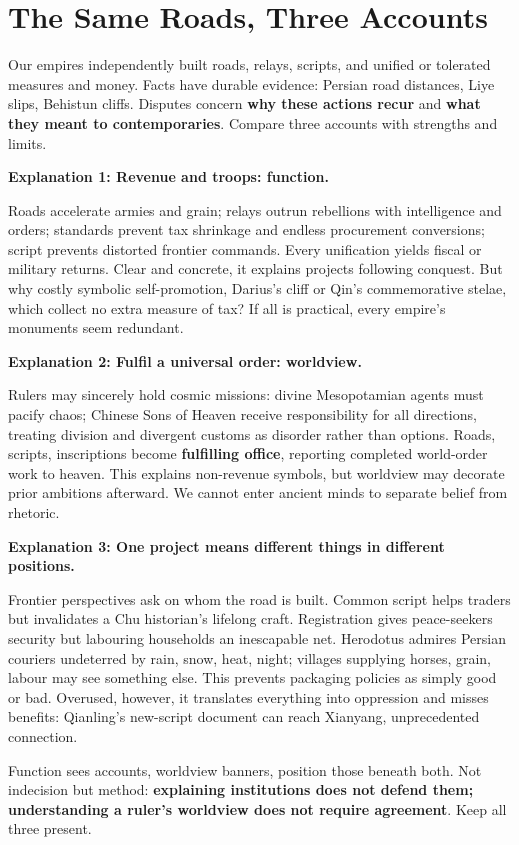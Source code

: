 \section{The Same Roads, Three Accounts}
Our empires independently built roads, relays, scripts, and unified or tolerated measures and money. Facts have durable evidence: Persian road distances, Liye slips, Behistun cliffs. Disputes concern \textbf{why these actions recur} and \textbf{what they meant to contemporaries}. Compare three accounts with strengths and limits.

\textbf{Explanation 1: Revenue and troops: function.}

Roads accelerate armies and grain; relays outrun rebellions with intelligence and orders; standards prevent tax shrinkage and endless procurement conversions; script prevents distorted frontier commands. Every unification yields fiscal or military returns. Clear and concrete, it explains projects following conquest. But why costly symbolic self-promotion, Darius's cliff or Qin's commemorative stelae, which collect no extra measure of tax? If all is practical, every empire's monuments seem redundant.

\textbf{Explanation 2: Fulfil a universal order: worldview.}

Rulers may sincerely hold cosmic missions: divine Mesopotamian agents must pacify chaos; Chinese Sons of Heaven receive responsibility for all directions, treating division and divergent customs as disorder rather than options. Roads, scripts, inscriptions become \textbf{fulfilling office}, reporting completed world-order work to heaven. This explains non-revenue symbols, but worldview may decorate prior ambitions afterward. We cannot enter ancient minds to separate belief from rhetoric.

\textbf{Explanation 3: One project means different things in different positions.}

Frontier perspectives ask on whom the road is built. Common script helps traders but invalidates a Chu historian's lifelong craft. Registration gives peace-seekers security but labouring households an inescapable net. Herodotus admires Persian couriers undeterred by rain, snow, heat, night; villages supplying horses, grain, labour may see something else. This prevents packaging policies as simply good or bad. Overused, however, it translates everything into oppression and misses benefits: Qianling's new-script document can reach Xianyang, unprecedented connection.

Function sees accounts, worldview banners, position those beneath both. Not indecision but method: \textbf{explaining institutions does not defend them; understanding a ruler's worldview does not require agreement}. Keep all three present.

